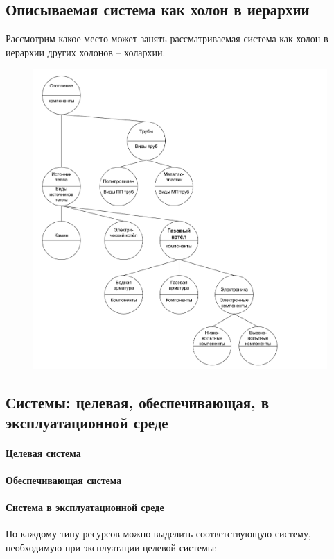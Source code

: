 \documentclass[bibliography=totocnumbered]{scrartcl}
\begin{document}
\subsection{Описываемая система как холон в иерархии}
Рассмотрим какое место может занять рассматриваемая система как холон в иерархии других холонов -- холархии.
\begin{figure}
  \centering \includegraphics[scale=0.5]{hol.png}
\end{figure}
\subsection{Системы: целевая, обеспечивающая, в эксплуатационной среде}
\paragraph{Целевая система}
\paragraph{Обеспечивающая система}

\paragraph{Система в эксплуатационной среде}
По каждому типу ресурсов можно выделить соответствующую систему, необходимую при эксплуатации целевой системы:
\end{document}
